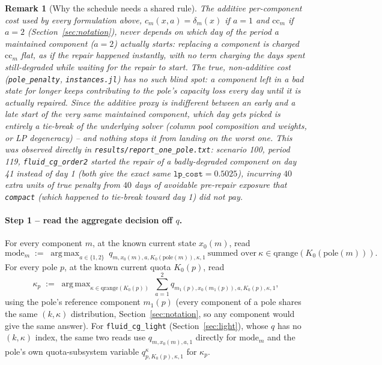 \documentclass[11pt]{article}
\newtheorem{remark}{Remark}
\newcommand{\pole}{\mathrm{pole}}
\DeclareMathOperator*{\argmax}{arg\,max}
\begin{document}
\begin{remark}[Why the schedule needs a shared rule]
The additive per-component cost used by every formulation above,
$c_m(x,a) = \delta_m(x)$ if $a=1$ and $\mathrm{cc}_m$ if $a=2$ (Section~\ref{sec:notation}),
never depends on \emph{which day} of the period a maintained component ($a=2$) actually
starts: replacing a component is charged $\mathrm{cc}_m$ flat, as if the repair happened
instantly, with no term charging the days spent still-degraded while waiting for the
repair to start. The true, non-additive cost (\texttt{pole\_penalty}, \texttt{instances.jl})
has no such blind spot: a component left in a bad state for longer keeps contributing to
the pole's capacity loss every day until it is actually repaired. Since the additive
proxy is indifferent between an early and a late start of the very same maintained
component, which day gets picked is entirely a tie-break of the underlying solver (column
pool composition and weights, or LP degeneracy) -- and nothing stops it from landing on
the worst one. This was observed directly in \texttt{results/report\_one\_pole.txt}:
scenario 100, period 119, \texttt{fluid\_cg\_order2} started the repair of a
badly-degraded component on day 41 instead of day 1 (both give the exact same
$\mathtt{lp\_cost} = 0.5025$), incurring $40$ extra units of true penalty from $40$ days of
avoidable pre-repair exposure that \texttt{compact} (which happened to tie-break toward day
1) did not pay.
\end{remark}

\paragraph{Step 1 -- read the aggregate decision off $q$.} For every component $m$, at the
known current state $x_0(m)$, read
\[
  \mathrm{mode}_m \;:=\; \argmax_{a \in \{1,2\}}\ q_{m,x_0(m),a,K_0(\pole(m)),\kappa,1}
  \ \text{summed over}\ \kappa \in \mathrm{qrange}(K_0(\pole(m))).
\]
For every pole $p$, at the known current quota $K_0(p)$, read
\[
  \kappa_p \;:=\; \argmax_{\kappa \in \mathrm{qrange}(K_0(p))}\
  \sum_{a=1}^{2} q_{m_1(p),x_0(m_1(p)),a,K_0(p),\kappa,1},
\]
using the pole's reference component $m_1(p)$ (every component of a pole shares the same
$(k,\kappa)$ distribution, Section~\ref{sec:notation}, so any component would give the same
answer). For \texttt{fluid\_cg\_light} (Section~\ref{sec:light}), whose $q$ has no $(k,\kappa)$
index, the same two reads use $q_{m,x_0(m),a,1}$ directly for $\mathrm{mode}_m$ and the
pole's own quota-subsystem variable $q^\kappa_{p,K_0(p),\kappa,1}$ for $\kappa_p$.
\end{document}

